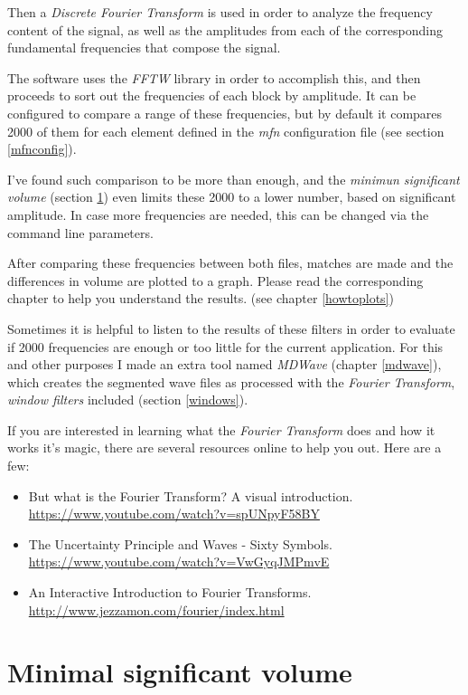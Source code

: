 \documentclass[10pt,a4paper]{report}
\begin{document}
Then a \textit{Discrete Fourier Transform} is used in order to analyze the frequency content of the signal, as well as the amplitudes from each of the corresponding fundamental frequencies that compose the signal.

The software uses the \textit{FFTW}\cite{fftw} library in order to accomplish this, and then proceeds to sort out the frequencies of each block by amplitude. It can be configured to compare a range of these frequencies, but by default it compares 2000 of them for each element defined in the \textit{mfn} configuration file (see section \ref{mfnconfig}).

I've found such comparison to be more than enough, and the \textit{minimun significant volume} (section \ref{MinSigVolume}) even limits these 2000 to a lower number, based on significant amplitude. In case more frequencies are needed, this can be changed via the command line parameters.

After comparing these frequencies between both files, matches are made and the differences in volume are plotted to a graph. Please read the corresponding chapter to help you understand the results. (see chapter \ref{howtoplots})

Sometimes it is helpful to listen to the results of these filters in order to evaluate if 2000 frequencies are enough or too little for the current application. For this and other purposes I made an extra tool named \textit{MDWave} (chapter \ref{mdwave}), which creates the segmented wave files as processed with the \textit{Fourier Transform}, \textit{window filters} included (section \ref{windows}).

If you are interested in learning what the \textit{Fourier Transform} does and how it works it's magic, there are several resources online to help you out. Here are a few:

\begin{itemize}
	\item But what is the Fourier Transform? A visual introduction.  \url{https://www.youtube.com/watch?v=spUNpyF58BY}
	\item The Uncertainty Principle and Waves - Sixty Symbols.  \url{https://www.youtube.com/watch?v=VwGyqJMPmvE}
	\item An Interactive Introduction to Fourier Transforms.  \url{http://www.jezzamon.com/fourier/index.html}
\end{itemize}


\section{Minimal significant volume}
\label{MinSigVolume}
\end{document}
